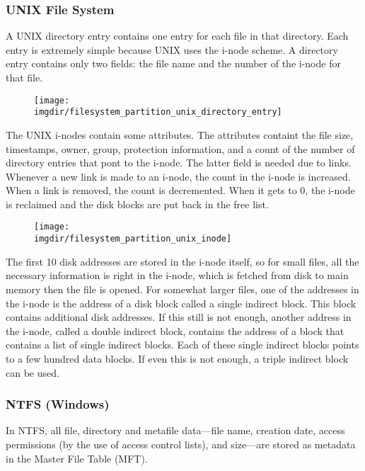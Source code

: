 \documentclass[a4paper, twoside]{article}
\newcommand{\imgdir}{../resources/images} %
\begin{document}
\subsubsection{UNIX File System}
A UNIX directory entry contains one entry for each file in that directory. Each entry is extremely simple because UNIX uses the i-node scheme. A directory entry contains only two fields: the file name and the number of the i-node for that file. 

\begin{figure}[h]
	\centering
	\texttt{[image: \\imgdir/filesystem\_partition\_unix\_directory\_entry]}
	\label{fig:filesystem_partition_unix_directory_entry}
\end{figure}

The UNIX i-nodes contain some attributes. The attributes containt the file size, timestamps, owner, group, protection information, and a count of the number of directory entries that pont to the i-node. The latter field is needed due to links. Whenever a new link is made to an i-node, the count in the i-node is increased. When a link is removed, the count is decremented. When it gets to 0, the i-node is reclaimed and the disk blocks are put back in the free list.

\begin{figure}[h]
	\centering
	\texttt{[image: \\imgdir/filesystem\_partition\_unix\_inode]}
	\label{fig:filesystem_partition_unix_inode}
\end{figure}

The first 10 disk addresses are stored in the i-node itself, so for small files, all the necessary information is right in the i-node, which is fetched from disk to main memory then the file is opened. For somewhat larger files, one of the addresses in the i-node is the address of a disk block called a single indirect block. This block contains additional disk addresses. If this still is not enough, another address in the i-node, called a double indirect block, contains the address of a block that contains a list of single indirect blocks. Each of these single indirect blocks points to a few hundred data blocks. If even this is not enough, a triple indirect block can be used.

\subsubsection{NTFS (Windows)}
In NTFS, all file, directory and metafile data—file name, creation date, access permissions (by the use of access control lists), and size—are stored as metadata in the Master File Table (MFT). 
\end{document}
